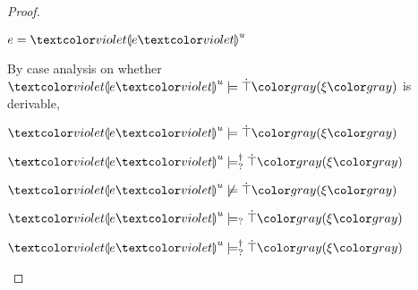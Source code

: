\begin{proof}
\begin{byCases}
  \item[\text{(\ref{rule:CMSExpHole})}]
    \begin{pfsteps*}
    \item $e = \hhole{e}{u}$  
    \end{pfsteps*}
    By case analysis on whether $\csatisfy{\hhole{e}{u}}{\ctruify{\xi}}$ is derivable,
    \begin{byCases}
    \item[\text{$\csatisfy{\hhole{e}{u}}{\ctruify{\xi}}$ is derivable}]
      \begin{pfsteps*}
      \item $\csatisfy{\hhole{e}{u}}{\ctruify{\xi}}$  
      \item $\csatisfyormay{\hhole{e}{u}}{\ctruify{\xi}}$ 
      \end{pfsteps*}
    \item[\text{$\csatisfy{\hhole{e}{u}}{\ctruify{\xi}}$ is not derivable}]
      \begin{pfsteps*}
      \item $\cnotsatisfy{\hhole{e}{u}}{\ctruify{\xi}}$  
      \item $\cmaysatisfy{\hhole{e}{u}}{\ctruify{\xi}}$  
      \item $\csatisfyormay{\hhole{e}{u}}{\ctruify{\xi}}$ 
      \end{pfsteps*}
    \end{byCases}


\end{byCases}
\end{proof}
